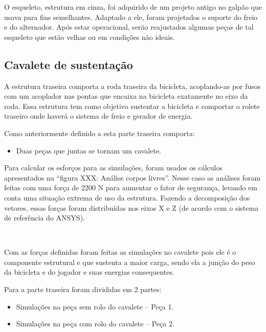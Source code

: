 
    O esqueleto, estrutura em cinza, foi adquirido de um projeto antigo no galpão que usava para fins semelhantes. Adaptado a ele, foram projetados o suporte do freio e do alternador. Após estar operacional, serão reajustados algumas peças de tal esqueleto que estão velhas ou em condições não ideais.

\subsection{Cavalete de sustentação}

    A estrutura traseira comporta a roda traseira da bicicleta, acoplando-as por fusos com um acoplador nas pontas que encaixa na bicicleta exatamente no eixo da roda. Essa estrutura tem como objetivo sustentar a bicicleta e comportar o rolete traseiro onde haverá o sistema de freio e gerador de energia.

    Como anteriormente definido a esta parte traseira comporta:
    \begin{itemize}
        \item Duas peças que juntas se tornam um cavalete.
    \end{itemize}
    

  
  
    Para calcular os esforços para as simulações, foram usados os cálculos apresentados na “figura XXX: Análise corpos livres”.  Nesse caso as análises foram feitas com uma força de 2200 N para aumentar o fator de segurança, levando em conta uma situação extrema de uso da estrutura. Fazendo a decomposição dos vetores, essas forças foram distribuídas nos eixos X e Z (de acordo com o sistema de referência do ANSYS).
 
 
­
 
    Com as forças definidas foram feitas as simulações no cavalete pois ele é o componente estrutural e que sustenta a maior carga, sendo ela a junção do peso da bicicleta e do jogador e suas energias consequentes.
 
    Para a parte traseira foram divididas em 2 partes:
    \begin{itemize}
        \item Simulações na peça sem rolo do cavalete – Peça 1.
        \item Simulações na peça com rolo do cavalete – Peça 2.
    \end{itemize}
 
